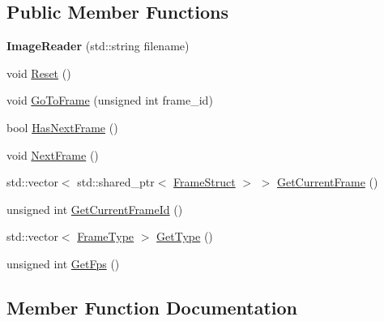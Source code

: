 \subsection*{Public Member Functions}
\begin{DoxyCompactItemize}
\item 
\mbox{\label{classmoetsi_1_1ssp_1_1ImageReader_a8b64ab50c05bcf2179a7921fdb9baa29}} 
{\bfseries Image\+Reader} (std\+::string filename)
\item 
void \hyperlink{classmoetsi_1_1ssp_1_1ImageReader_ae9ffc89ceed365c96b8d50e46ee8dc20}{Reset} ()
\item 
void \hyperlink{classmoetsi_1_1ssp_1_1ImageReader_a32eb88cc612e6920f4910e0803b0ce3c}{Go\+To\+Frame} (unsigned int frame\+\_\+id)
\item 
bool \hyperlink{classmoetsi_1_1ssp_1_1ImageReader_ad8e87720ca0ec97de501f1070119b28d}{Has\+Next\+Frame} ()
\item 
void \hyperlink{classmoetsi_1_1ssp_1_1ImageReader_a9b0a43f9a4fff4d0b8448e8ba168ad05}{Next\+Frame} ()
\item 
std\+::vector$<$ std\+::shared\+\_\+ptr$<$ \hyperlink{structmoetsi_1_1ssp_1_1FrameStruct}{Frame\+Struct} $>$ $>$ \hyperlink{classmoetsi_1_1ssp_1_1ImageReader_aacdb29f83bf5e38231ef26d89338c3b1}{Get\+Current\+Frame} ()
\item 
unsigned int \hyperlink{classmoetsi_1_1ssp_1_1ImageReader_a386125736df9f25e5c4312bb679ff031}{Get\+Current\+Frame\+Id} ()
\item 
std\+::vector$<$ \hyperlink{namespacemoetsi_1_1ssp_a46efdfa2cd5a28ead465dcc8006b5a87}{Frame\+Type} $>$ \hyperlink{classmoetsi_1_1ssp_1_1ImageReader_af6f66957b6e3268c5336f4176c77fc73}{Get\+Type} ()
\item 
unsigned int \hyperlink{classmoetsi_1_1ssp_1_1ImageReader_a86adfec8106c366aaf1ec63e2a7da156}{Get\+Fps} ()
\end{DoxyCompactItemize}


\subsection{Member Function Documentation}
\mbox{\label{classmoetsi_1_1ssp_1_1ImageReader_aacdb29f83bf5e38231ef26d89338c3b1}} 
